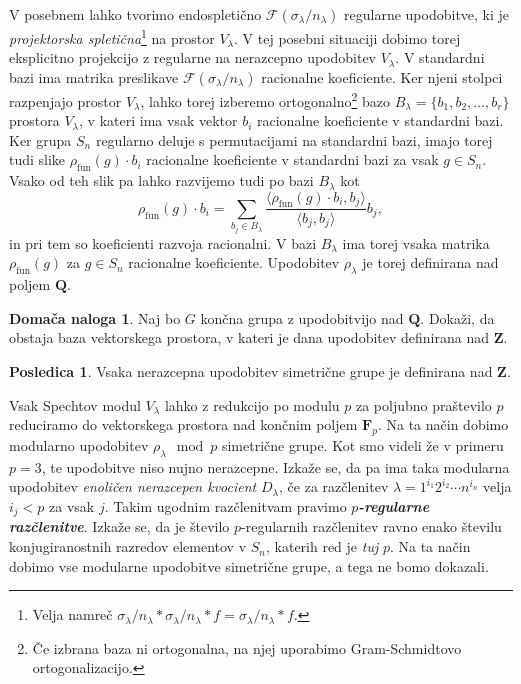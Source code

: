 \documentclass[11pt]{book}
\def\ZZ{\mathbf{Z}}
\def\QQ{\mathbf{Q}}
\def\FF{\mathbf{F}}
\def\Fcal{\mathcal{F}}
\def\youngsym{\sigma_{\lambda}}
\DeclareMathOperator\fun{fun}
\def\definicija{\color{rdeca}\bf\em}
\theoremstyle{definition}
\theoremstyle{zgled}
\theoremstyle{odprtproblem}
\theoremstyle{domacanaloga}
\newtheorem*{domacanaloga}{Domača naloga}
\theoremstyle{izrek}
\newtheorem*{posledica}{Posledica}
\begin{document}
V posebnem lahko tvorimo endospletično $\Fcal(\youngsym / n_{\lambda})$ regularne upodobitve, ki je \emph{projektorska spletična}\footnote{Velja namreč $\youngsym/n_{\lambda} * \youngsym/n_{\lambda} * f = \youngsym/n_{\lambda} * f$.} na prostor $V_{\lambda}$. V tej posebni situaciji dobimo torej eksplicitno projekcijo z regularne na nerazcepno upodobitev $V_{\lambda}$. V standardni bazi ima matrika preslikave $\Fcal(\youngsym/n_{\lambda})$ racionalne koeficiente. Ker njeni stolpci razpenjajo prostor $V_{\lambda}$, lahko torej izberemo ortogonalno\footnote{Če izbrana baza ni ortogonalna, na njej uporabimo Gram-Schmidtovo ortogonalizacijo.} bazo $B_{\lambda} = \{ b_1, b_2, \dots, b_r \}$ prostora $V_{\lambda}$, v kateri ima vsak vektor $b_i$ racionalne koeficiente v standardni bazi. Ker grupa $S_n$ regularno deluje s permutacijami na standardni bazi, imajo torej tudi slike $\rho_{\fun}(g) \cdot b_i$ racionalne koeficiente v standardni bazi za vsak $g \in S_n$. Vsako od teh slik pa lahko razvijemo tudi po bazi $B_{\lambda}$ kot
\[
    \rho_{\fun}(g) \cdot b_i
    = \sum_{b_j \in B_{\lambda}} \frac{\langle \rho_{\fun}(g) \cdot b_i, b_j \rangle}{\langle b_j, b_j \rangle} b_j,
\]
in pri tem so koeficienti razvoja racionalni. V bazi $B_{\lambda}$ ima torej vsaka matrika $\rho_{\fun}(g)$ za $g \in S_n$ racionalne koeficiente. Upodobitev $\rho_{\lambda}$ je torej definirana nad poljem $\QQ$.

\begin{domacanaloga}
Naj bo $G$ končna grupa z upodobitvijo nad $\QQ$. Dokaži, da obstaja baza vektorskega prostora, v kateri je dana upodobitev definirana nad $\ZZ$.
\end{domacanaloga}

\begin{posledica}
Vsaka nerazcepna upodobitev simetrične grupe je definirana nad $\ZZ$.
\end{posledica}    

Vsak Spechtov modul $V_{\lambda}$ lahko z redukcijo po modulu $p$ za poljubno praštevilo $p$ reduciramo do vektorskega prostora nad končnim poljem $\FF_p$. Na ta način dobimo modularno upodobitev $\rho_{\lambda} \mod{p}$ simetrične grupe. Kot smo videli že v primeru $p = 3$, te upodobitve niso nujno nerazcepne. Izkaže se, da pa ima taka modularna upodobitev \emph{enoličen nerazcepen kvocient} $D_{\lambda}$, če za razčlenitev $\lambda = 1^{i_1} 2^{i_2} \cdots n^{i_n}$ velja $i_j < p$ za vsak $j$. Takim ugodnim razčlenitvam pravimo {\definicija $p$-regularne razčlenitve}. Izkaže se, da je število $p$-regularnih razčlenitev ravno enako številu konjugiranostnih razredov elementov v $S_n$, katerih red je \emph{tuj} $p$. Na ta način dobimo vse modularne upodobitve simetrične grupe, a tega ne bomo dokazali.
\end{document}
